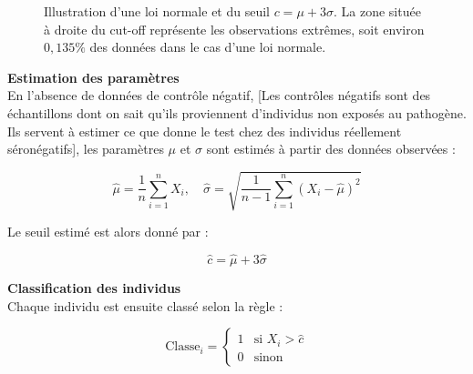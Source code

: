 \documentclass[a4paper]{article}
\begin{document}
\begin{figure}[h!]
\centering
{}
\caption{Illustration d’une loi normale et du seuil \(c=\mu+3\sigma\). La zone située à droite du cut-off représente les observations extrêmes, soit environ \(0{,}135\%\) des données dans le cas d’une loi normale.}
\end{figure}

\textbf{Estimation des paramètres} \\

En l’absence de données de contrôle négatif, [Les contrôles négatifs sont des échantillons dont on sait qu’ils proviennent d’individus non exposés au pathogène. Ils servent à estimer ce que donne le test chez des individus réellement séronégatifs], les paramètres $\mu$ et $\sigma$ sont estimés à partir des données observées :

\[
\hat{\mu} = \frac{1}{n} \sum_{i=1}^{n} X_i, \quad
\hat{\sigma} = \sqrt{\frac{1}{n-1} \sum_{i=1}^{n} (X_i - \hat{\mu})^2}
\]

Le seuil estimé est alors donné par :

\[
\hat{c} = \hat{\mu} + 3 \hat{\sigma}
\]

\textbf{Classification des individus} \\

Chaque individu est ensuite classé selon la règle :

\[
\text{Classe}_i =
\begin{cases}
1 & \text{si } X_i > \hat{c} \\
0 & \text{sinon}
\end{cases}
\]
\end{document}

